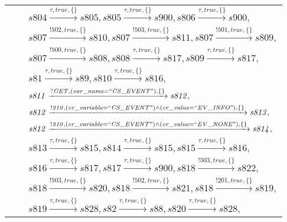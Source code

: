 \begin{tabular}{lcp{350px}}
& & $\mathit{s804}\xrightarrow{\mathit{\tau}, \mathit{true}, \{\}}\mathit{s805},\mathit{s805}\xrightarrow{\mathit{\tau}, \mathit{true}, \{\}}\mathit{s900},\mathit{s806}\xrightarrow{\mathit{\tau}, \mathit{true}, \{\}}\mathit{s900},$ \\
& & $\mathit{s807}\xrightarrow{\mathit{!502}, \mathit{true}, \{\}}\mathit{s810},\mathit{s807}\xrightarrow{\mathit{!503}, \mathit{true}, \{\}}\mathit{s811},\mathit{s807}\xrightarrow{\mathit{!501}, \mathit{true}, \{\}}\mathit{s809},$ \\
& & $\mathit{s807}\xrightarrow{\mathit{!500}, \mathit{true}, \{\}}\mathit{s808},\mathit{s808}\xrightarrow{\mathit{\tau}, \mathit{true}, \{\}}\mathit{s817},\mathit{s809}\xrightarrow{\mathit{\tau}, \mathit{true}, \{\}}\mathit{s817},$ \\
& & $\mathit{s81}\xrightarrow{\mathit{\tau}, \mathit{true}, \{\}}\mathit{s89},\mathit{s810}\xrightarrow{\mathit{\tau}, \mathit{true}, \{\}}\mathit{s816},$ \\
& & $\mathit{s811}\xrightarrow{\mathit{?GET}, \mathit{(var\_name = ``CS\_EVENT")}, \{\}}\mathit{s812},$ \\
& & $\mathit{s812}\xrightarrow{\mathit{!210}, \mathit{(cr\_variable = ``CS\_EVENT") \land (cr\_value = ``EV\_INFO")}, \{\}}\mathit{s813},$ \\
& & $\mathit{s812}\xrightarrow{\mathit{!210}, \mathit{(cr\_variable = ``CS\_EVENT") \land (cr\_value = ``EV\_NONE")}, \{\}}\mathit{s814},$ \\
& & $\mathit{s813}\xrightarrow{\mathit{\tau}, \mathit{true}, \{\}}\mathit{s815},\mathit{s814}\xrightarrow{\mathit{\tau}, \mathit{true}, \{\}}\mathit{s815},\mathit{s815}\xrightarrow{\mathit{\tau}, \mathit{true}, \{\}}\mathit{s816},$ \\
& & $\mathit{s816}\xrightarrow{\mathit{\tau}, \mathit{true}, \{\}}\mathit{s817},\mathit{s817}\xrightarrow{\mathit{\tau}, \mathit{true}, \{\}}\mathit{s900},\mathit{s818}\xrightarrow{\mathit{!503}, \mathit{true}, \{\}}\mathit{s822},$ \\
& & $\mathit{s818}\xrightarrow{\mathit{!503}, \mathit{true}, \{\}}\mathit{s820},\mathit{s818}\xrightarrow{\mathit{!502}, \mathit{true}, \{\}}\mathit{s821},\mathit{s818}\xrightarrow{\mathit{!201}, \mathit{true}, \{\}}\mathit{s819},$ \\
& & $\mathit{s819}\xrightarrow{\mathit{\tau}, \mathit{true}, \{\}}\mathit{s828},\mathit{s82}\xrightarrow{\mathit{\tau}, \mathit{true}, \{\}}\mathit{s88},\mathit{s820}\xrightarrow{\mathit{\tau}, \mathit{true}, \{\}}\mathit{s828},$ \\

\end{tabular}
